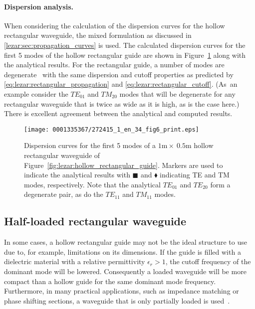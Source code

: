 \paragraph{Dispersion analysis.}

When considering the calculation of the dispersion curves for the
hollow rectangular waveguide, the mixed formulation as discussed in
\ref{lezar:sec:propagation_curves} is used. The calculated dispersion
curves for the first 5 modes of the hollow rectangular guide are shown
in Figure~\ref{fig:lezar:hollow_rectangular_dispersion_curves}
along with the analytical results. For the rectangular
guide, a number of modes are degenerate~\cite[see][Chapter
10]{Davidson2011} with the same dispersion and cutoff properties
as predicted by \eqref{eq:lezar:rectangular_propagation} and
\eqref{eq:lezar:rectangular_cutoff}. (As~an example consider the $TE_{01}$
and $TM_{20}$ modes that will be degenerate for any rectangular waveguide
that is twice as wide as it is high, as is the case here.) There is
excellent agreement between the analytical and computed results.
\begin{figure}[!t]
  \centering
  \texttt{[image: 0001335367/272415\_1\_en\_34\_fig6\_print.eps]}
  \caption{Dispersion curves for the first 5 modes of a
  $1\text{m}\times~0.5\text{m}$ hollow rectangular waveguide of
  Figure~\ref{fig:lezar:hollow_rectangular_guide}. Markers are used to
  indicate the analytical results with $\blacksquare$ and $\blacklozenge$
  indicating TE and TM modes, respectively. Note that the analytical
  $TE_{01}$ and $TE_{20}$ form a degenerate pair, as do the $TE_{11}$
  and $TM_{11}$ modes.}
  \label{fig:lezar:hollow_rectangular_dispersion_curves}
\end{figure}

\subsection{Half-loaded rectangular waveguide}

In some cases, a hollow rectangular guide may not be the ideal structure
to use due to, for example, limitations on its dimensions. If the guide
is filled with a dielectric material with a relative permittivity
$\epsilon_r > 1$, the cutoff frequency of the dominant mode will be
lowered. Consequently a loaded waveguide will be more compact than
a hollow guide for the same dominant mode frequency. Furthermore,
in many practical applications, such as impedance matching or phase
shifting sections, a waveguide that is only partially loaded is
used~\citep{Pozar2005}.

